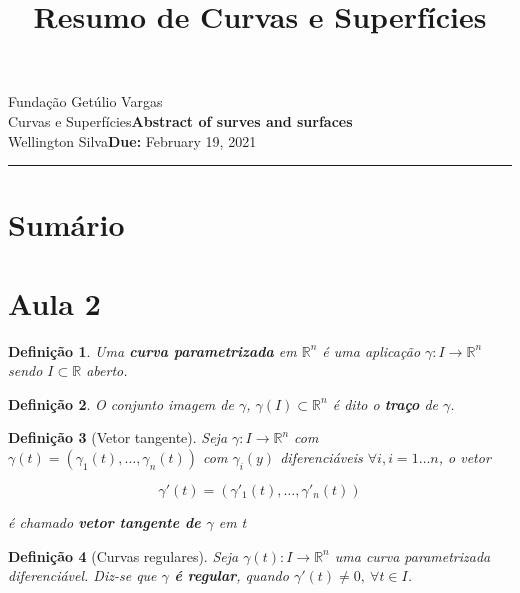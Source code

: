 \documentclass{article}
\title{Resumo de Curvas e Superfícies}
\author{}
\date{}
\newtheorem{definition}{Definição}
\newcommand{\assignment}{Abstract of surves and surfaces}
\newcommand{\duedate}{February 19, 2021}
\begin{document}
Fundação Getúlio Vargas\hfill\\
Curvas e Superfícies\hfill\textbf{\assignment}\\
Wellington Silva\hfill\textbf{Due:} \duedate\\
\smallskip\hrule\bigskip

{\let\newpage\relax\maketitle}
\maketitle

\section*{Sumário}

\textbf{}
\vspace{4.0mm}

\newpage

\section*{Aula 2}
\label{s1}

\begin{definition}
Uma \textbf{curva parametrizada} em $\mathbb{R}^n$ é uma aplicação $\gamma: I \rightarrow \mathbb{R}^n$ sendo $I \subset \mathbb{R}$ aberto.
\end{definition}

\begin{definition}
O conjunto imagem de $\gamma$, $\gamma(I) \subset \mathbb{R}^n$ é dito o \textbf{traço} de $\gamma$.
\end{definition}

\begin{definition}[Vetor tangente]
Seja $\gamma: I \rightarrow \mathbb{R}^n$ com $\gamma(t) = (\gamma_1 (t), \ldots, \gamma_n (t))$ com $\gamma_i (y)$ diferenciáveis $\forall i, i = 1 \ldots n$, o vetor

$$\gamma'(t) = (\gamma'_1 (t), \ldots, \gamma'_n (t))$$

é chamado \textbf{vetor tangente de $\gamma$} em t
\end{definition}

\begin{definition}[Curvas regulares]
Seja $\gamma (t): I \rightarrow \mathbb{R}^n$ uma curva parametrizada diferenciável. Diz-se que \textbf{$\gamma$ é regular}, quando $\gamma'(t) \neq 0,\ \forall t \in I$. 
\end{definition}
\end{document}
